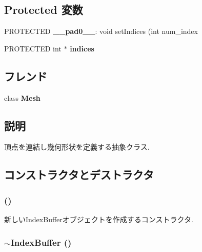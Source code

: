 \subsection*{Protected 変数}
\begin{CompactItemize}
\item 
\hypertarget{classm3g_1_1IndexBuffer_11d260eb623ff241a55524ad8bc9beb4}{
PROTECTED \textbf{\_\-\_\-pad0\_\-\_\-}: void setIndices (int num\_\-index}
\label{classm3g_1_1IndexBuffer_11d260eb623ff241a55524ad8bc9beb4}

\item 
\hypertarget{classm3g_1_1IndexBuffer_6b7df92152fe609a14f72e9634a55421}{
PROTECTED int $\ast$ \textbf{indices}}
\label{classm3g_1_1IndexBuffer_6b7df92152fe609a14f72e9634a55421}

\end{CompactItemize}
\subsection*{フレンド}
\begin{CompactItemize}
\item 
\hypertarget{classm3g_1_1IndexBuffer_a41a130f156b145bffb3f4b5172c4c93}{
class \textbf{Mesh}}
\label{classm3g_1_1IndexBuffer_a41a130f156b145bffb3f4b5172c4c93}

\end{CompactItemize}


\subsection{説明}
頂点を連結し幾何形状を定義する抽象クラス. 

\subsection{コンストラクタとデストラクタ}
\hypertarget{classm3g_1_1IndexBuffer_d2e68a2d7c6c753d3abfeef42ee79427}{
\subsubsection[{IndexBuffer}]{ ()}}
\label{classm3g_1_1IndexBuffer_d2e68a2d7c6c753d3abfeef42ee79427}


新しいIndexBufferオブジェクトを作成するコンストラクタ. \hypertarget{classm3g_1_1IndexBuffer_ac7952364fe4d2d7b2731da5380c841c}{
\subsubsection[{$\sim$IndexBuffer}]{\setlength{\rightskip}{0pt plus 5cm}$\sim${\bf IndexBuffer} ()}}
\label{classm3g_1_1IndexBuffer_ac7952364fe4d2d7b2731da5380c841c}


